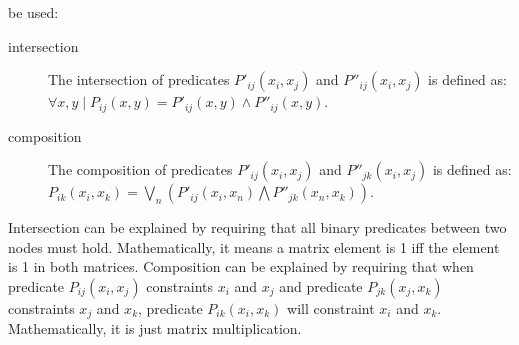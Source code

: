\documentclass[a4paper,11pt]{article}
\begin{document}
be used:
\begin{description}
\item[intersection]
The intersection of predicates $P'_{ij}(x_i, x_j)$ and $P''_{ij}(x_i, x_j)$
is defined as: \\
$\forall x, y \mid P_{ij}(x, y) = P'_{ij}(x, y) \wedge
P''_{ij}(x, y)$.
\item[composition]
The composition of predicates $P'_{ij}(x_i, x_j)$ and $P''_{jk}(x_i, x_j)$
is defined as: \\
$P_{ik}(x_i, x_k) = 
\bigvee_n \left( P'_{ij}(x_i, x_n) \bigwedge 
P''_{jk}(x_n, x_k) \right)$.
\end{description}
Intersection can be explained by requiring that all binary predicates
between two nodes must hold. Mathematically, it means a matrix element is 1
iff the element is 1 in both matrices. Composition can be explained by
requiring
that when predicate $P_{ij}(x_i, x_j)$ constraints $x_i$ and $x_j$
and predicate $P_{jk}(x_j, x_k)$ constraints $x_j$ and $x_k$, predicate
$P_{ik}(x_i, x_k)$ will constraint $x_i$ and $x_k$. Mathematically, it
is just matrix multiplication.
\end{document}
